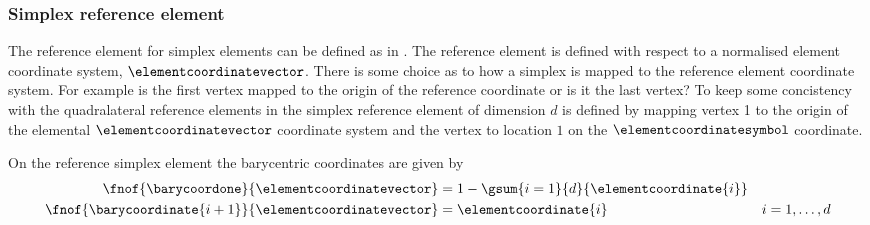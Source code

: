 \subsubsection{Simplex reference element}
\label{subsubsec:BasisFunctionsSimplexReferenceElement}

The reference element for simplex elements can be defined as
in . The reference element is defined
with respect to a normalised element coordinate system,
$\elementcoordinatevector$. There is some choice as to how a simplex is mapped to
the reference element coordinate system. For example is the first
vertex mapped to the origin of the reference coordinate or is it the
last vertex? To keep some concistency with the quadralateral reference
elements in \OpenCMISS the simplex reference element of dimension $d$
is defined by mapping vertex 1 to the origin of the elemental
$\elementcoordinatevector$ coordinate system and the  vertex to location
$1$ on the  $\elementcoordinatesymbol$ coordinate.


On the reference simplex element the barycentric coordinates are given by
\begin{alignat}{3}
\fnof{\barycoordone}{\elementcoordinatevector}&=1-\gsum{i=1}{d}{\elementcoordinate{i}}& \\
\fnof{\barycoordinate{i+1}}{\elementcoordinatevector}&=\elementcoordinate{i} & i=1,\ldots,d
\end{alignat}

